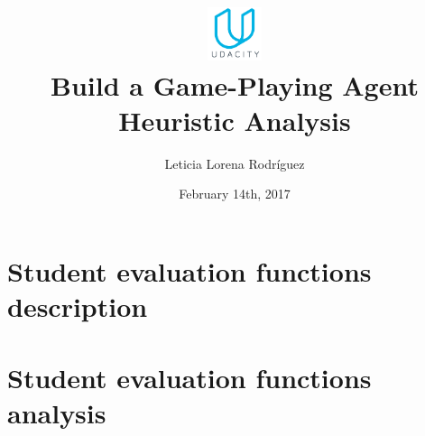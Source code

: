 \documentclass[10pt, a4paper,english]{article}
\author{\normalsize{Leticia Lorena Rodr\'iguez}}
\date{\normalsize{February 14th, 2017}} %
\title{
	\centering
	\includegraphics[width=0.12\textwidth]{udacity-small.png}\\
Build a Game-Playing Agent \\
\large {Heuristic Analysis}
} %
\begin{document}
\maketitle

\section{Student evaluation functions description}



\section{Student evaluation functions analysis}
\end{document}
